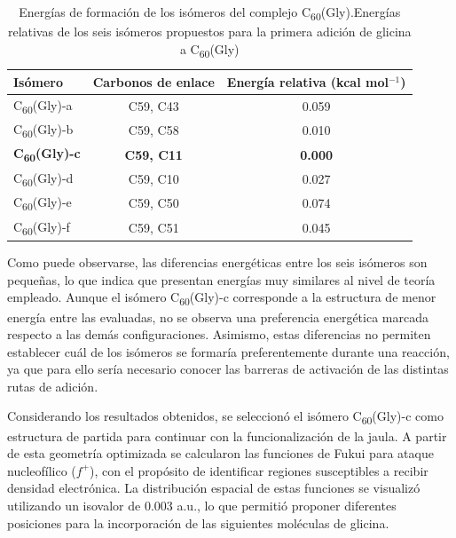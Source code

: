 \begin{table}[H]
    \centering
    \caption{Energías de formación de los isómeros del complejo C\textsubscript{60}(Gly).Energías relativas de los seis isómeros propuestos para la primera adición de glicina a C\textsubscript{60}(Gly) }
    \label{tab:isomeros-gly1}
    \renewcommand{\arraystretch}{1.15}
    \begin{tabular}{lcc}
        \toprule
        \textbf{Isómero} & \textbf{Carbonos de enlace} & \textbf{Energía relativa (kcal mol$^{-1}$)} \\
        \midrule
      C\textsubscript{60}(Gly)-a & C59, C43 & 0.059 \\
      C\textsubscript{60}(Gly)-b & C59, C58 & 0.010 \\
       \textbf{  C\textsubscript{60}(Gly)-c} &\textbf{ C59, C11} & \textbf{0.000} \\
         C\textsubscript{60}(Gly)-d & C59, C10 & 0.027 \\
        C\textsubscript{60}(Gly)-e & C59, C50 & 0.074 \\
         C\textsubscript{60}(Gly)-f & C59, C51 & 0.045 \\
        \bottomrule
    \end{tabular}
\end{table}      
        
  Como puede observarse, las diferencias energéticas entre los seis isómeros son pequeñas, lo que indica que presentan energías muy similares al nivel de teoría empleado. Aunque el isómero C\textsubscript{60}(Gly)-c corresponde a la estructura de menor energía entre las evaluadas, no se observa una preferencia energética marcada respecto a las demás configuraciones. Asimismo, estas diferencias no permiten establecer cuál de los isómeros se formaría preferentemente durante una reacción, ya que para ello sería necesario conocer las barreras de activación de las distintas rutas de adición.

Considerando los resultados obtenidos, se seleccionó el isómero C\textsubscript{60}(Gly)-c como estructura de partida para continuar con la funcionalización de la jaula. A partir de esta geometría optimizada se calcularon las funciones de Fukui para ataque nucleofílico ($f^{+}$), con el propósito de identificar regiones susceptibles a recibir densidad electrónica. La distribución espacial de estas funciones se visualizó utilizando un isovalor de 0.003 a.u., lo que permitió proponer diferentes posiciones para la incorporación de las siguientes moléculas de glicina.

